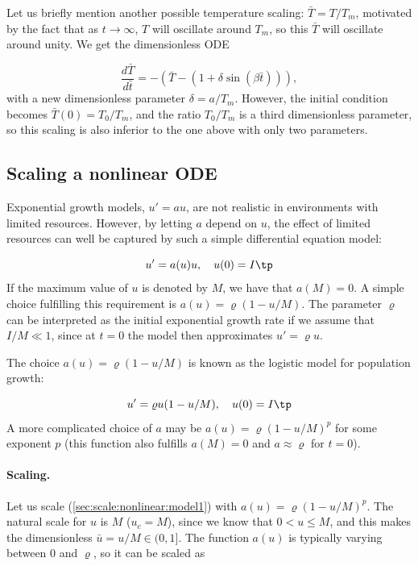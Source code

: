 \documentclass[graybox,envcountchap,sectrefs,final]{svmonodo}
\begin{document}
Let us briefly mention another possible temperature scaling:
$\bar T = T/T_m$, motivated by the fact that as $t\rightarrow\infty$,
$T$ will oscillate around $T_m$, so this $\bar T$ will oscillate around
unity. We get the dimensionless ODE

\[ \frac{d\bar T}{d\bar t} = -(\bar T - (1 + \delta\sin(\beta\bar t))),\]
with a new dimensionless parameter $\delta = a/T_m$. However, the initial
condition becomes $\bar T(0)=T_0/T_m$, and the ratio $T_0/T_m$ is
a third dimensionless parameter, so this scaling is also inferior to the
one above with only two parameters.

\subsection{Scaling a nonlinear ODE}
\label{sec:scale:nonlinear}


Exponential growth models, $u'=au$, are not realistic in environments
with limited resources. However, by letting $a$ depend on $u$, the effect
of limited resources can well be captured by such a simple differential
equation model:

\begin{equation}
u' = a(u)u,\quad u(0)=I\tp
\label{sec:scale:nonlinear:model1}
\end{equation}
If the maximum value of $u$ is denoted by $M$, we have that $a(M)=0$.
A simple choice fulfilling this requirement is $a(u)=\varrho(1-u/M)$.
The parameter $\varrho$ can be interpreted as the initial exponential
growth rate if we assume that $I/M\ll 1$, since at $t=0$ the model then
approximates $u'=\varrho u$.

The choice $a(u)=\varrho(1-u/M)$ is known as the logistic model for
population growth:

\begin{equation}
u' = \varrho u(1-u/M),\quad u(0)=I\tp
\label{sec:scale:nonlinear:model2}
\end{equation}
A more complicated choice of $a$ may be $a(u)=\varrho(1-u/M)^p$ for
some exponent $p$ (this function also fulfills $a(M)=0$ and $a\approx\varrho$
for $t=0$).


\paragraph{Scaling.}
Let us scale (\ref{sec:scale:nonlinear:model1}) with
$a(u)=\varrho (1-u/M)^p$.
The natural scale for $u$ is $M$ ($u_c=M$), since we know that
$0 < u\leq M$, and this makes the dimensionless $\bar u = u/M \in (0,1]$.
The function $a(u)$ is
typically varying between 0 and $\varrho$, so it can be scaled as
\end{document}
